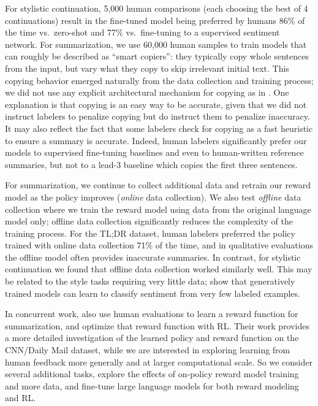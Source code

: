 \documentclass{article}
\begin{document}
For stylistic continuation, 5,000 human comparisons (each choosing the best of 4 continuations) result in the fine-tuned model being preferred by humans 86\% of the time vs.\ zero-shot and 77\% vs.\ fine-tuning to a supervised sentiment network.  For summarization, we use 60,000 human samples to train models that can roughly be described as ``smart copiers'': they typically copy whole sentences from the input, but vary what they copy to skip irrelevant initial text.  This copying behavior emerged naturally from the data collection and training process; we did not use any explicit architectural mechanism for copying as in \citet{see2017get,gehrmann2018bottom}.  
One explanation is that copying is an easy way to be accurate, given that we did not instruct labelers to penalize copying but do instruct them to penalize inaccuracy.
It may also reflect the fact that some labelers check for copying as a fast heuristic to ensure a summary is accurate.  Indeed, human labelers significantly prefer our models to supervised fine-tuning baselines and even to human-written reference summaries, but not to a lead-3 baseline which copies the first three sentences.

For summarization, we continue to collect additional
data and retrain our reward model as the policy improves
(\emph{online} data collection).
We also test \emph{offline} data collection where we train the reward model using
data from the original language model only;
offline data collection significantly reduces the complexity of the training process.
For the TL;DR dataset,
human labelers preferred the policy trained with online data collection
71\% of the time,
and in qualitative evaluations the offline model often
provides inaccurate summaries.
In contrast, for stylistic continuation
we found that offline data collection worked similarly well.
This may be related to the style tasks requiring very little data;
\citet{radford2017learning} show that generatively trained models can learn to classify sentiment from very few labeled examples.

In concurrent work, \citet{bohm2019rl}
also use human evaluations to learn a reward function for summarization, and optimize that reward function with RL.
Their work provides
a more detailed investigation
of the learned policy and reward function
on the CNN/Daily Mail dataset,
while we are interested in exploring
learning from human feedback more generally and at larger computational scale.
So we consider several additional tasks,
explore the effects of on-policy reward
model training and more data,
and fine-tune large language models for both reward modeling and RL.
\end{document}

